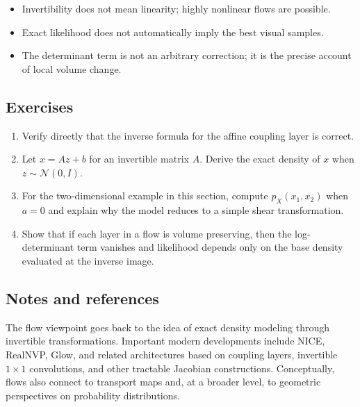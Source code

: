 \begin{itemize}
    \item Invertibility does not mean linearity; highly nonlinear flows are possible.
    \item Exact likelihood does not automatically imply the best visual samples.
    \item The determinant term is not an arbitrary correction; it is the precise account of local volume change.
\end{itemize}

\subsection*{Exercises}

\begin{enumerate}
    \item Verify directly that the inverse formula for the affine coupling layer is correct.
    \item Let $x=Az+b$ for an invertible matrix $A$. Derive the exact density of $x$ when $z\sim\mathcal{N}(0,I)$.
    \item For the two-dimensional example in this section, compute $p_X(x_1,x_2)$ when $a=0$ and explain why the model reduces to a simple shear transformation.
    \item Show that if each layer in a flow is volume preserving, then the log-determinant term vanishes and likelihood depends only on the base density evaluated at the inverse image.
\end{enumerate}

\subsection*{Notes and references}

The flow viewpoint goes back to the idea of exact density modeling through invertible transformations.
Important modern developments include NICE, RealNVP, Glow, and related architectures based on coupling layers, invertible $1\times 1$ convolutions, and other tractable Jacobian constructions.
Conceptually, flows also connect to transport maps and, at a broader level, to geometric perspectives on probability distributions.
